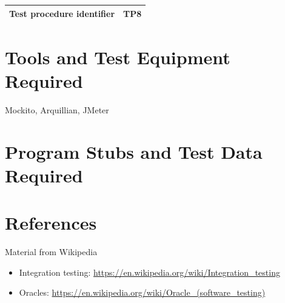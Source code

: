 \documentclass[a4paper,11pt]{report} %
\begin{document}
				\begin{center}
					\begin{tabular}{| l | p{10cm} |}\hline
						\textbf{Test procedure identifier} & TP8\\\hline
					\end{tabular}
				\end{center}																																	
									

	
	\section{Tools and Test Equipment Required}
		Mockito, Arquillian, JMeter
	
	
	\section{Program Stubs and Test Data Required}
	
	\pagebreak
	\section{References}
		Material from Wikipedia
		\begin{itemize}
			\item Integration testing: \href{https://en.wikipedia.org/wiki/Integration_testing}{https://en.wikipedia.org/wiki/Integration\_testing}
			\item Oracles: \href{https://en.wikipedia.org/wiki/Oracle_(software_testing)}{https://en.wikipedia.org/wiki/Oracle\_(software\_testing)}
		\end{itemize}
	
\end{document}
